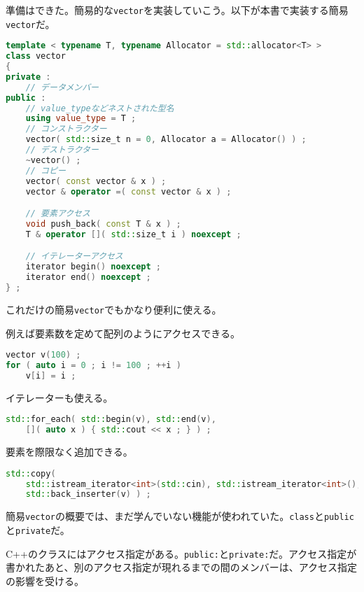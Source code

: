 準備はできた。簡易的な\texttt{vector}を実装していこう。以下が本書で実装する簡易\texttt{vector}だ。

\ifTombow\enlargethispage{3mm}\fi
\begin{lstlisting}[language={C++}]
template < typename T, typename Allocator = std::allocator<T> >
class vector
{
private :
    // データメンバー
public :
    // value_typeなどネストされた型名
    using value_type = T ;
    // コンストラクター
    vector( std::size_t n = 0, Allocator a = Allocator() ) ;
    // デストラクター
    ~vector() ;
    // コピー
    vector( const vector & x ) ;
    vector & operator =( const vector & x ) ;

    // 要素アクセス
    void push_back( const T & x ) ;
    T & operator []( std::size_t i ) noexcept ;

    // イテレーターアクセス
    iterator begin() noexcept ;
    iterator end() noexcept ;
} ;
\end{lstlisting}

これだけの簡易\texttt{vector}でもかなり便利に使える。

例えば要素数を定めて配列のようにアクセスできる。

\begin{lstlisting}[language={C++}]
vector v(100) ;
for ( auto i = 0 ; i != 100 ; ++i )
    v[i] = i ; 
\end{lstlisting}

イテレーターも使える。

\begin{lstlisting}[language={C++}]
std::for_each( std::begin(v), std::end(v),
    []( auto x ) { std::cout << x ; } ) ;
\end{lstlisting}

要素を際限なく追加できる。

\begin{lstlisting}[language={C++}]
std::copy(
    std::istream_iterator<int>(std::cin), std::istream_iterator<int>(), 
    std::back_inserter(v) ) ;
\end{lstlisting}


簡易\texttt{vector}の概要では、まだ学んでいない機能が使われていた。\texttt{class}と\texttt{public}と\texttt{private}だ。

C++のクラスにはアクセス指定がある。\texttt{public:}と\texttt{private:}だ。アクセス指定が書かれたあと、別のアクセス指定が現れるまでの間のメンバーは、アクセス指定の影響を受ける。


